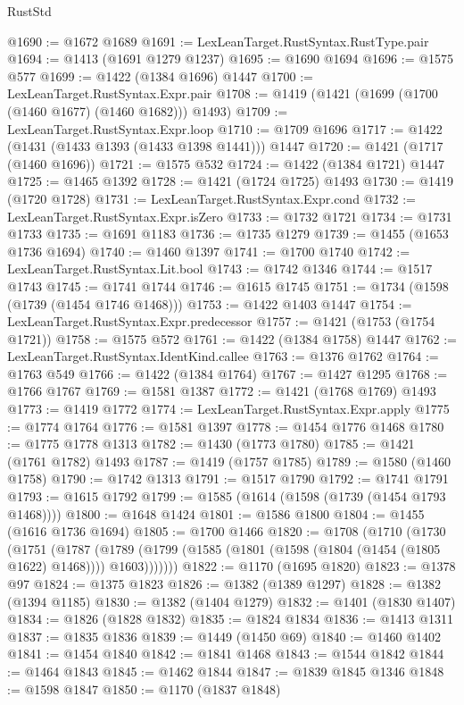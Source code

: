 \begin{lexlean}{RustStd}
\begin{coremodule}
@1690 := @1672 @1689
@1691 := LexLeanTarget.RustSyntax.RustType.pair
@1694 := @1413 (@1691 @1279 @1237)
@1695 := @1690 @1694
@1696 := @1575 @577
@1699 := @1422 (@1384 @1696) @1447
@1700 := LexLeanTarget.RustSyntax.Expr.pair
@1708 := @1419 (@1421 (@1699 (@1700 (@1460 @1677) (@1460 @1682))) @1493)
@1709 := LexLeanTarget.RustSyntax.Expr.loop
@1710 := @1709 @1696
@1717 := @1422 (@1431 (@1433 @1393 (@1433 @1398 @1441))) @1447
@1720 := @1421 (@1717 (@1460 @1696))
@1721 := @1575 @532
@1724 := @1422 (@1384 @1721) @1447
@1725 := @1465 @1392
@1728 := @1421 (@1724 @1725) @1493
@1730 := @1419 (@1720 @1728)
@1731 := LexLeanTarget.RustSyntax.Expr.cond
@1732 := LexLeanTarget.RustSyntax.Expr.isZero
@1733 := @1732 @1721
@1734 := @1731 @1733
@1735 := @1691 @1183
@1736 := @1735 @1279
@1739 := @1455 (@1653 @1736 @1694)
@1740 := @1460 @1397
@1741 := @1700 @1740
@1742 := LexLeanTarget.RustSyntax.Lit.bool
@1743 := @1742 @1346
@1744 := @1517 @1743
@1745 := @1741 @1744
@1746 := @1615 @1745
@1751 := @1734 (@1598 (@1739 (@1454 @1746 @1468)))
@1753 := @1422 @1403 @1447
@1754 := LexLeanTarget.RustSyntax.Expr.predecessor
@1757 := @1421 (@1753 (@1754 @1721))
@1758 := @1575 @572
@1761 := @1422 (@1384 @1758) @1447
@1762 := LexLeanTarget.RustSyntax.IdentKind.callee
@1763 := @1376 @1762
@1764 := @1763 @549
@1766 := @1422 (@1384 @1764)
@1767 := @1427 @1295
@1768 := @1766 @1767
@1769 := @1581 @1387
@1772 := @1421 (@1768 @1769) @1493
@1773 := @1419 @1772
@1774 := LexLeanTarget.RustSyntax.Expr.apply
@1775 := @1774 @1764
@1776 := @1581 @1397
@1778 := @1454 @1776 @1468
@1780 := @1775 @1778 @1313
@1782 := @1430 (@1773 @1780)
@1785 := @1421 (@1761 @1782) @1493
@1787 := @1419 (@1757 @1785)
@1789 := @1580 (@1460 @1758)
@1790 := @1742 @1313
@1791 := @1517 @1790
@1792 := @1741 @1791
@1793 := @1615 @1792
@1799 := @1585 (@1614 (@1598 (@1739 (@1454 @1793 @1468))))
@1800 := @1648 @1424
@1801 := @1586 @1800
@1804 := @1455 (@1616 @1736 @1694)
@1805 := @1700 @1466
@1820 := @1708
    (@1710
      (@1730
        (@1751
          (@1787
            (@1789 (@1799 (@1585 (@1801 (@1598 (@1804 (@1454 (@1805 @1622) @1468)))) @1603)))))))
@1822 := @1170 (@1695 @1820)
@1823 := @1378 @97
@1824 := @1375 @1823
@1826 := @1382 (@1389 @1297)
@1828 := @1382 (@1394 @1185)
@1830 := @1382 (@1404 @1279)
@1832 := @1401 (@1830 @1407)
@1834 := @1826 (@1828 @1832)
@1835 := @1824 @1834
@1836 := @1413 @1311
@1837 := @1835 @1836
@1839 := @1449 (@1450 @69)
@1840 := @1460 @1402
@1841 := @1454 @1840
@1842 := @1841 @1468
@1843 := @1544 @1842
@1844 := @1464 @1843
@1845 := @1462 @1844
@1847 := @1839 @1845 @1346
@1848 := @1598 @1847
@1850 := @1170 (@1837 @1848)

\end{coremodule}
\end{lexlean}
